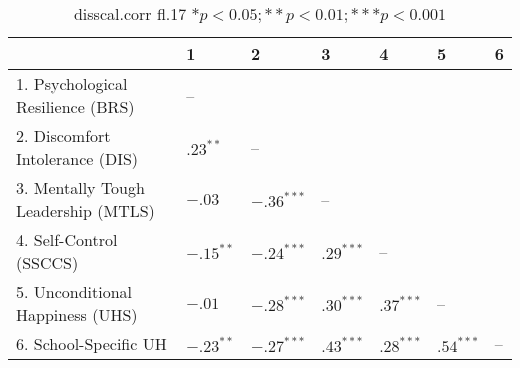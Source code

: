 \begin{table}[ht]
\centering
\begin{tabular}{lllllll}
  \hline
 & 1 & 2 & 3 & 4 & 5 & 6 \\ 
  \hline
1. Psychological Resilience (BRS) & -- &  &  &  &  &  \\ 
  2. Discomfort Intolerance (DIS) & $.23^{**}$ & -- &  &  &  &  \\ 
  3. Mentally Tough Leadership (MTLS) & $-.03$ & $-.36^{***}$ & -- &  &  &  \\ 
  4. Self-Control (SSCCS) & $-.15^{**}$ & $-.24^{***}$ & $.29^{***}$ & -- &  &  \\ 
  5. Unconditional Happiness (UHS) & $-.01$ & $-.28^{***}$ & $.30^{***}$ & $.37^{***}$ & -- &  \\ 
  6. School-Specific UH & $-.23^{**}$ & $-.27^{***}$ & $.43^{***}$ & $.28^{***}$ & $.54^{***}$ & -- \\ 
   \hline
\end{tabular}
\caption{disscal.corr fl.17 $* p < 0.05; ** p < 0.01; *** p < 0.001$} 
\label{freq_corr.disscal.corr.fl.17}
\end{table}
